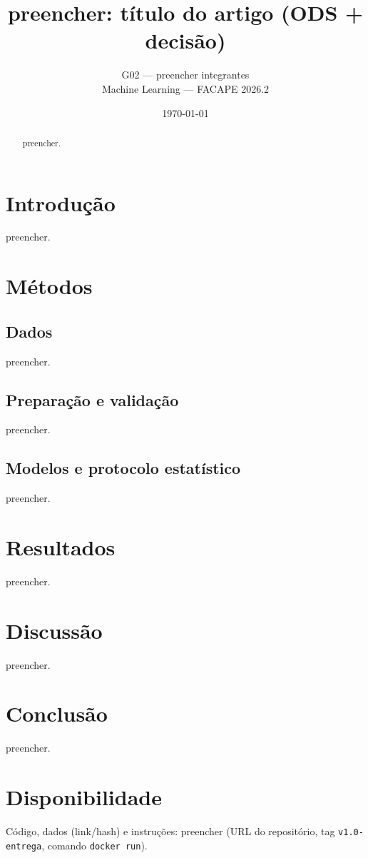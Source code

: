 \documentclass[11pt,a4paper]{article}
\title{preencher: título do artigo (ODS + decisão)}
\author{G02 --- preencher integrantes \\ Machine Learning --- FACAPE 2026.2}
\date{\today}
\begin{document}
\maketitle

\begin{abstract}
preencher.
\end{abstract}

\section{Introdução}
preencher.

\section{Métodos}
\subsection{Dados}
preencher.

\subsection{Preparação e validação}
preencher.

\subsection{Modelos e protocolo estatístico}
preencher.

\section{Resultados}
% 
preencher.

\section{Discussão}
preencher.

\section{Conclusão}
preencher.

\section*{Disponibilidade}
Código, dados (link/hash) e instruções: preencher (URL do repositório, tag
\texttt{v1.0-entrega}, comando \texttt{docker run}).



\end{document}
